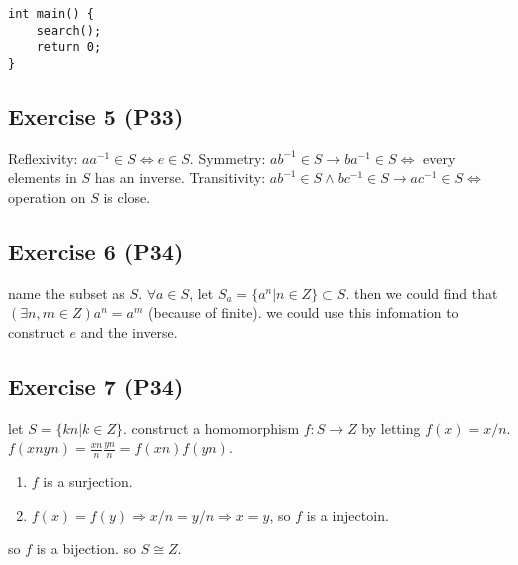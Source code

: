 \documentclass[11pt]{article}
\begin{document}
\begin{verbatim}
int main() {
    search();
    return 0;
}
\end{verbatim}
\subsection{Exercise 5 (P33)}
\label{sec:org93b6be4}
Reflexivity: \(aa^{-1}\in S \Leftrightarrow e\in S\).
Symmetry: \(ab^{-1}\in S \to ba^{-1}\in S \Leftrightarrow\) every elements in \(S\) has an inverse.
Transitivity: \(ab^{-1} \in S \land bc^{-1}\in S \to ac^{-1}\in S \Leftrightarrow\) operation on \(S\) is close.
\subsection{Exercise 6 (P34)}
\label{sec:org116c354}
name the subset as \(S\).
\(\forall a\in S\), let \(S_a = \{a^n | n\in Z\} \subset S\).
then we could find that \((\exists n, m \in Z) a^n = a^m\) (because of finite).
we could use this infomation to construct \(e\) and the inverse.
\subsection{Exercise 7 (P34)}
\label{sec:orgdf065c8}
let \(S = \{kn | k \in Z\}\).
construct a homomorphism \(f: S \to Z\) by letting \(f(x) = x/n\).
\(f(xnyn) = \frac{xn}{n}\frac{yn}{n} = f(xn)f(yn)\).
\begin{enumerate}
\item \(f\) is a surjection.
\item \(f(x) = f(y) \Rightarrow x/n = y/n \Rightarrow x = y\), so \(f\) is a injectoin.
\end{enumerate}
so \(f\) is a bijection.
so \(S\cong Z\).
\end{document}
